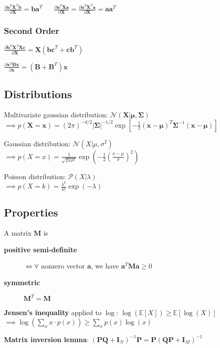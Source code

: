 \documentclass[10pt,a4paper,landscape]{article}
\renewcommand{\bf}[1]{\ensuremath{\mathbf{#1}}}
\begin{document}
\begin{multicols*}{4}
$\frac{\partial\bf{a}^T\bf{X}^T\bf{b}}{\partial\bf{X}} = \bf{ba}^T$
$\quad$
$\frac{\partial\bf{a}^T\bf{Xa}}{\partial\bf{X}} = \frac{\partial\bf{a}^T\bf{X}^T\bf{a}}{\partial\bf{X}} = \bf{aa}^T$
\subsubsection{Second Order}
$\frac{\partial\bf{b}^T\bf{X}^T\bf{Xc}}{\partial\bf{X}} = \bf{X}(\bf{bc}^T+\bf{cb}^T)$

$\frac{\partial\bf{x}^T\bf{Bx}}{\partial\bf{x}} = (\bf{B}+\bf{B}^T)\bf{x}$

\subsection{Distributions}
Multivariate gaussian distribution: $\mathcal{N}(\bf{X} | \bf{\mu} , \bf{\Sigma})$ \\
$\implies p(\bf{X} = \bf{x}) = (2 \pi)^{-d/2} |\bf{\Sigma|}^{-1/2} \exp{[- \frac{1}{2} (\bf{x} - \bf{\mu})^T \bf{\Sigma}^{-1} (\bf{x} - \bf{\mu})]}$

Gaussian distribution: $\mathcal{N}(X| \mu, \sigma^2)$ \\
$\implies p(X = x) = \frac{1}{\sqrt{2 \pi \sigma^2}} \exp{(- \frac{1}{2} ( \frac{x - \mu}{\sigma} )^2)}$

Poisson distribution: $\mathcal{P}(X| \lambda)$ \\
$\implies p(X = k) = \frac{\lambda ^ k}{k!} \exp{(- \lambda)}$

\subsection{Properties}

A matrix $\bf{M}$ is
\begin{description}
\item[\textbf{positive semi-definite}] $\iff \forall$ nonzero vector $\bf{a}$, we have $\bf{a}^T \bf{M} \bf{a} \geq 0$
\item[\textbf{symmetric}] $\bf{M}^T = \bf{M}$
\end{description}


\textbf{Jensen's inequality} applied to $\log$: $\log( \mathbb{E}[X] ) \geq \mathbb{E}[\log(X)]$ \\
$\implies \log ( \sum_x x \cdot p(x) ) \geq \sum_x p(x) \log(x)$

\textbf{Matrix inversion lemma}: $(\bf{PQ} + \bf{I}_N)^{-1} \bf{P} = \bf{P}(\bf{QP} + \bf{I}_M)^{-1}$


\end{multicols*}
\end{document}
